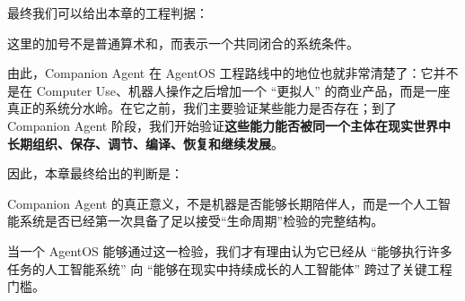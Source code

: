 最终我们可以给出本章的工程判据：

\begin{statementbox}
\centering
{}
\end{statementbox}

这里的加号不是普通算术和，而表示一个共同闭合的系统条件。

由此，Companion Agent 在 AgentOS 工程路线中的地位也就非常清楚了：它并不是在 Computer Use、机器人操作之后增加一个 ``更拟人'' 的商业产品，而是一座真正的系统分水岭。在它之前，我们主要验证某些能力是否存在；到了 Companion Agent 阶段，我们开始验证\textbf{这些能力能否被同一个主体在现实世界中长期组织、保存、调节、编译、恢复和继续发展}。

因此，本章最终给出的判断是：

\begin{proposition*}
Companion Agent 的真正意义，不是机器是否能够长期陪伴人，而是一个人工智能系统是否已经第一次具备了足以接受“生命周期”检验的完整结构。
\end{proposition*}

当一个 AgentOS 能够通过这一检验，我们才有理由认为它已经从 ``能够执行许多任务的人工智能系统'' 向 ``能够在现实中持续成长的人工智能体'' 跨过了关键工程门槛。
